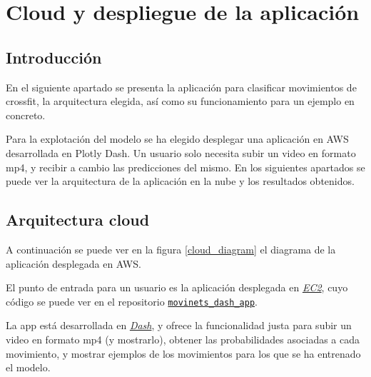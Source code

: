 

\section{Cloud y despliegue de la aplicación}\label{despliegue}

\subsection{Introducción}

En el siguiente apartado se presenta la aplicación para clasificar movimientos de crossfit, la arquitectura elegida, así como su funcionamiento para un ejemplo en concreto.

Para la explotación del modelo se ha elegido desplegar una aplicación en AWS desarrollada en Plotly Dash. Un usuario solo necesita subir un video en formato mp4, y recibir a cambio las predicciones del mismo. En los siguientes apartados se puede ver la arquitectura de la aplicación en la nube y los resultados obtenidos.

\subsection{Arquitectura cloud}

A continuación se puede ver en la figura \ref{cloud_diagram} el diagrama de la aplicación desplegada en AWS.

El punto de entrada para un usuario es la aplicación desplegada en \href{https://aws.amazon.com/es/ec2/}{\textit{EC2}}, cuyo código se puede ver en el repositorio \href{https://github.com/plaguss/movinets_dash_app}{\texttt{movinets\_dash\_app}}.

La app está desarrollada en \href{https://plotly.com/dash/}{\textit{Dash}}, y ofrece la funcionalidad justa para subir un video en formato mp4 (y mostrarlo), obtener las probabilidades asociadas a cada movimiento, y mostrar ejemplos de los movimientos para los que se ha entrenado el modelo.

